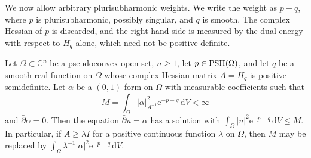 
We now allow arbitrary plurisubharmonic weights. We write the weight as $p+q$, where $p$ is plurisubharmonic, possibly singular, and $q$ is smooth. The complex Hessian of $p$ is discarded, and the right-hand side is measured by the dual energy with respect to $H_q$ alone, which need not be positive definite.

\begin{theorem}\label{thm:hormander-singular-lower-bound}
Let $\Omega\subset\mathbb C^n$ be a pseudoconvex open set, $n\ge1$, let $p\in\mathrm{PSH}(\Omega)$, and let $q$ be a smooth real function on $\Omega$ whose complex Hessian matrix $A=H_q$ is positive semidefinite. Let $\alpha$ be a $(0,1)$-form on $\Omega$ with measurable coefficients such that
\[
 M=\int_\Omega|\alpha|_{A^{-1}}^2\mathrm e^{-p-q}\,\mathrm dV<\infty
\]
and $\bar\partial\alpha=0$. Then the equation $\bar\partial u=\alpha$ has a solution with $\int_\Omega|u|^2\mathrm e^{-p-q}\,\mathrm dV\le M$. In particular, if $A\ge\lambda I$ for a positive continuous function $\lambda$ on $\Omega$, then $M$ may be replaced by $\int_\Omega\lambda^{-1}|\alpha|^2\mathrm e^{-p-q}\,\mathrm dV$.
\end{theorem}
